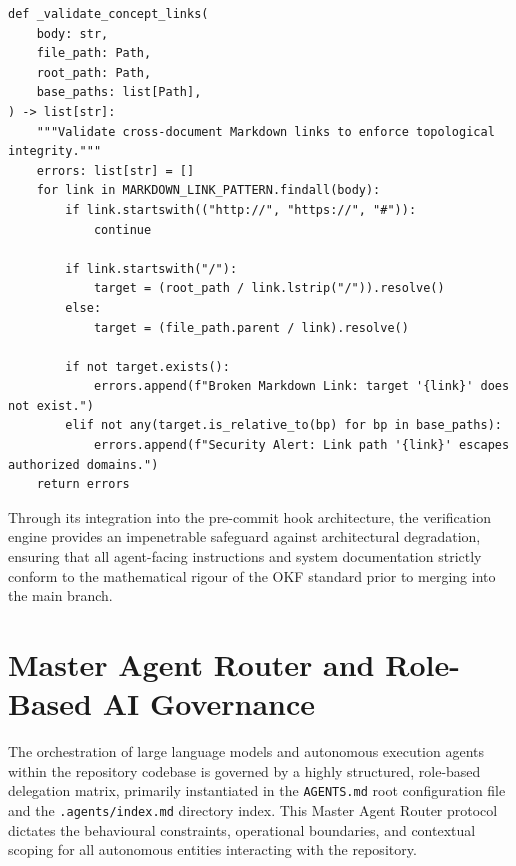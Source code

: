 \begin{listing}[htbp]
\begin{verbatim}
def _validate_concept_links(
    body: str,
    file_path: Path,
    root_path: Path,
    base_paths: list[Path],
) -> list[str]:
    """Validate cross-document Markdown links to enforce topological integrity."""
    errors: list[str] = []
    for link in MARKDOWN_LINK_PATTERN.findall(body):
        if link.startswith(("http://", "https://", "#")):
            continue

        if link.startswith("/"):
            target = (root_path / link.lstrip("/")).resolve()
        else:
            target = (file_path.parent / link).resolve()

        if not target.exists():
            errors.append(f"Broken Markdown Link: target '{link}' does not exist.")
        elif not any(target.is_relative_to(bp) for bp in base_paths):
            errors.append(f"Security Alert: Link path '{link}' escapes authorized domains.")
    return errors
\end{verbatim}
\caption{Algorithmic validation of intra-repository Markdown cross-references to ensure knowledge graph connectivity.}
\label{lst:validate_okf_links}
\end{listing}

Through its integration into the pre-commit hook architecture, the verification engine provides an impenetrable safeguard against architectural degradation, ensuring that all agent-facing instructions and system documentation strictly conform to the mathematical rigour of the OKF standard prior to merging into the main branch.

\section{Master Agent Router and Role-Based AI Governance}
\label{sec:master_agent_router_and_governance}



The orchestration of large language models and autonomous execution agents within the repository codebase is governed by a highly structured, role-based delegation matrix, primarily instantiated in the \texttt{AGENTS.md} root configuration file and the \texttt{.agents/index.md} directory index. This Master Agent Router protocol dictates the behavioural constraints, operational boundaries, and contextual scoping for all autonomous entities interacting with the repository.

